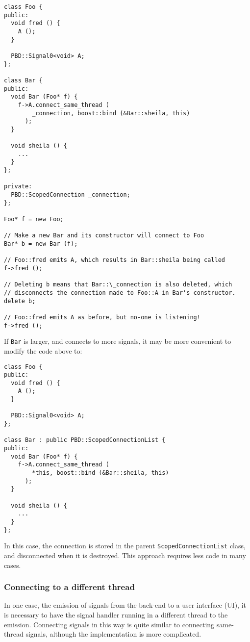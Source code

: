 \documentclass[10pt,a4paper]{book}
\newcommand{\code}[1]{\texttt{#1}}
\begin{document}
\begin{lstlisting}
class Foo {
public:
  void fred () {
    A ();
  }

  PBD::Signal0<void> A;
};

class Bar {
public:
  void Bar (Foo* f) {
    f->A.connect_same_thread (
        _connection, boost::bind (&Bar::sheila, this)
      );
  }

  void sheila () {
    ...
  }
};

private:
  PBD::ScopedConnection _connection;
};

Foo* f = new Foo;

// Make a new Bar and its constructor will connect to Foo
Bar* b = new Bar (f);

// Foo::fred emits A, which results in Bar::sheila being called
f->fred ();

// Deleting b means that Bar::\_connection is also deleted, which
// disconnects the connection made to Foo::A in Bar's constructor.
delete b;

// Foo::fred emits A as before, but no-one is listening!
f->fred ();
\end{lstlisting}

If \code{Bar} is larger, and connects to more signals, it may be more
convenient to modify the code above to:

\begin{lstlisting}
class Foo {
public:
  void fred () {
    A ();
  }

  PBD::Signal0<void> A;
};

class Bar : public PBD::ScopedConnectionList {
public:
  void Bar (Foo* f) {
    f->A.connect_same_thread (
        *this, boost::bind (&Bar::sheila, this)
      );
  }

  void sheila () {
    ...
  }
};
\end{lstlisting}

In this case, the connection is stored in the parent
\code{ScopedConnectionList} class, and disconnected when it is
destroyed.  This approach requires less code in many cases.

\subsubsection{Connecting to a different thread}

In one case, the emission of signals from the back-end to a user
interface (UI), it is necessary to have the signal handler running in
a different thread to the emission.  Connecting signals in this way is
quite similar to connecting same-thread signals, although the
implementation is more complicated.
\end{document}
